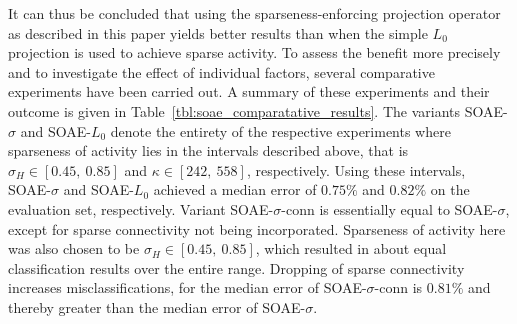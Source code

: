 \documentclass[twoside,11pt]{article}
\newcommand{\intervalcc}[2]{\left[#1,\ #2\right]}
\newcommand{\0}{\mathcal{O}}
\begin{document}
It can thus be concluded that using the sparseness-enforcing projection operator as described in this paper yields better results than when the simple $L_0$ projection is used to achieve sparse activity.
To assess the benefit more precisely and to investigate the effect of individual factors, several comparative experiments have been carried out.
A summary of these experiments and their outcome is given in Table~\ref{tbl:soae_comparatative_results}.
The variants SOAE-$\sigma$ and SOAE-$L_0$ denote the entirety of the respective experiments where sparseness of activity lies in the intervals described above, that is $\sigma_H\in\intervalcc{0.45}{0.85}$ and $\kappa\in\intervalcc{242}{558}$, respectively.
Using these intervals, SOAE-$\sigma$ and SOAE-$L_0$ achieved a median error of $0.75\%$ and $0.82\%$ on the evaluation set, respectively.
Variant SOAE-$\sigma$-conn is essentially equal to SOAE-$\sigma$, except for sparse connectivity not being incorporated.
Sparseness of activity here was also chosen to be $\sigma_H\in\intervalcc{0.45}{0.85}$, which resulted in about equal classification results over the entire range.
Dropping of sparse connectivity increases misclassifications, for the median error of SOAE-$\sigma$-conn is $0.81\%$ and thereby greater than the median error of SOAE-$\sigma$.
\end{document}
